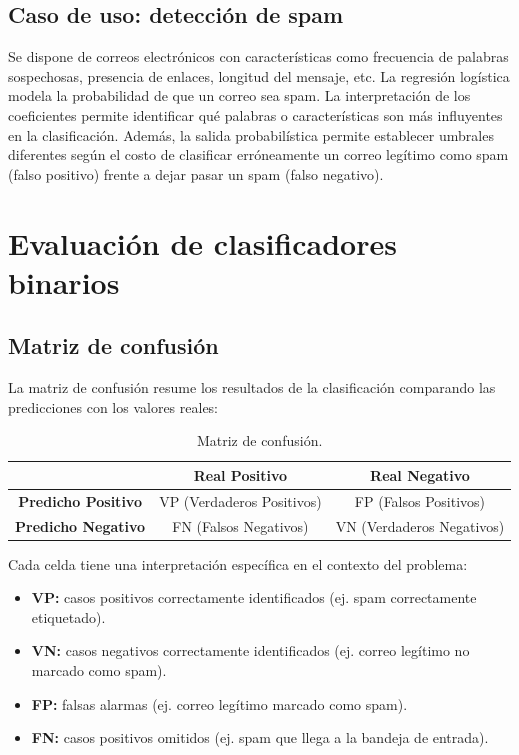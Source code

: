 \documentclass[12pt,a4paper,openany,oneside]{book}
\begin{document}
\subsection{Caso de uso: detección de spam}
Se dispone de correos electrónicos con características como frecuencia de palabras sospechosas, presencia de enlaces, longitud del mensaje, etc. La regresión logística modela la probabilidad de que un correo sea spam. La interpretación de los coeficientes permite identificar qué palabras o características son más influyentes en la clasificación. Además, la salida probabilística permite establecer umbrales diferentes según el costo de clasificar erróneamente un correo legítimo como spam (falso positivo) frente a dejar pasar un spam (falso negativo).

\section{Evaluación de clasificadores binarios}

\subsection{Matriz de confusión}
La matriz de confusión resume los resultados de la clasificación comparando las predicciones con los valores reales:

\begin{table}[h]
\centering
\begin{tabular}{c|c|c}
 & \textbf{Real Positivo} & \textbf{Real Negativo} \\
\hline
\textbf{Predicho Positivo} & VP (Verdaderos Positivos) & FP (Falsos Positivos) \\
\textbf{Predicho Negativo} & FN (Falsos Negativos) & VN (Verdaderos Negativos) \\
\end{tabular}
\caption{Matriz de confusión.}
\end{table}

Cada celda tiene una interpretación específica en el contexto del problema:
\begin{itemize}
    \item \textbf{VP:} casos positivos correctamente identificados (ej. spam correctamente etiquetado).
    \item \textbf{VN:} casos negativos correctamente identificados (ej. correo legítimo no marcado como spam).
    \item \textbf{FP:} falsas alarmas (ej. correo legítimo marcado como spam).
    \item \textbf{FN:} casos positivos omitidos (ej. spam que llega a la bandeja de entrada).
\end{itemize}
\end{document}
